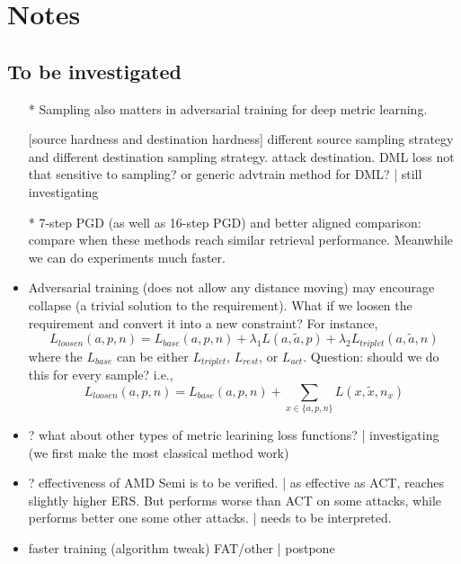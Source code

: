 \appendix

\section{Notes}

\subsection{To be investigated}

\begin{itemize}

	\item [*] Sampling also matters in adversarial training for deep metric learning.

		[source hardness and destination hardness] different source sampling
		strategy and different destination sampling strategy. attack
		destination. DML loss not that sensitive to sampling? or generic
		advtrain method for DML? | still investigating

	\item [*] 7-step PGD (as well as 16-step PGD) and better aligned comparison:
		compare when these methods reach similar retrieval performance.
		Meanwhile we can do experiments much faster.

	\item Adversarial training (does not allow any distance moving) may
		encourage collapse (a trivial solution to the requirement). What if we
		loosen the requirement and convert it into a new constraint? For
		instance, \[
			L_{loosen}(a,p,n)=L_{base}(a,p,n)+\lambda_{1}L(a,\tilde{a},p)+\lambda_{2}L_{triplet}(a,\tilde{a},n)
		\] where the $L_{base}$ can be either $L_{triplet}$, $L_{rest}$, or
		$L_{act}$. Question: should we do this for every sample? i.e., \[
			L_{loosen}(a,p,n)=L_{base}(a,p,n)+\sum_{x\in\{a,p,n\}}L(x,\tilde{x},n_{x})
		\]

	\item ?  what about other types of metric learining loss functions? |
		investigating (we first make the most classical method work)

	\item ?  effectiveness of AMD Semi is to be verified. | as effective
		as ACT, reaches slightly higher ERS. But performs worse than ACT on
		some attacks, while performs better one some other attacks. | needs to
		be interpreted.

	\item faster training (algorithm tweak) FAT/other | postpone


\end{itemize}
